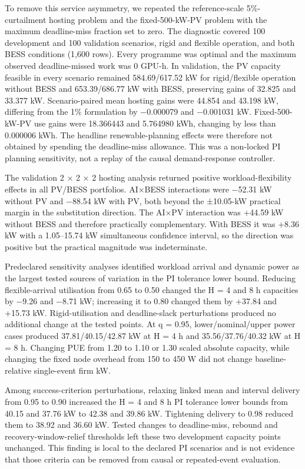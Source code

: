 \documentclass[10pt,a4paper]{article}
\begin{document}
To remove this service asymmetry, we repeated the reference-scale 5\%-curtailment hosting problem and the fixed-500-kW-PV problem with the maximum deadline-miss fraction set to zero. The diagnostic covered 100 development and 100 validation scenarios, rigid and flexible operation, and both BESS conditions (1,600 rows). Every programme was optimal and the maximum observed deadline-missed work was 0 GPU-h. In validation, the PV capacity feasible in every scenario remained 584.69/617.52 kW for rigid/flexible operation without BESS and 653.39/686.77 kW with BESS, preserving gains of 32.825 and 33.377 kW. Scenario-paired mean hosting gains were 44.854 and 43.198 kW, differing from the 1\% formulation by −0.000079 and −0.001031 kW. Fixed-500-kW-PV use gains were 18.366443 and 5.764980 kWh, changing by less than 0.000006 kWh. The headline renewable-planning effects were therefore not obtained by spending the deadline-miss allowance. This was a non-locked PI planning sensitivity, not a replay of the causal demand-response controller.


The validation 2 × 2 × 2 hosting analysis returned positive workload-flexibility effects in all PV/BESS portfolios. AI×BESS interactions were −52.31 kW without PV and −88.54 kW with PV, both beyond the ±10.05-kW practical margin in the substitution direction. The AI×PV interaction was +44.59 kW without BESS and therefore practically complementary. With BESS it was +8.36 kW with a 1.05–15.74 kW simultaneous confidence interval, so the direction was positive but the practical magnitude was indeterminate.


Predeclared sensitivity analyses identified workload arrival and dynamic power as the largest tested sources of variation in the PI tolerance lower bound. Reducing flexible-arrival utilisation from 0.65 to 0.50 changed the H = 4 and 8 h capacities by −9.26 and −8.71 kW; increasing it to 0.80 changed them by +37.84 and +15.73 kW. Rigid-utilisation and deadline-slack perturbations produced no additional change at the tested points. At q = 0.95, lower/nominal/upper power cases produced 37.81/40.15/42.87 kW at H = 4 h and 35.56/37.76/40.32 kW at H = 8 h. Changing PUE from 1.20 to 1.10 or 1.30 scaled absolute capacity, while changing the fixed node overhead from 150 to 450 W did not change baseline-relative single-event firm kW.


Among success-criterion perturbations, relaxing linked mean and interval delivery from 0.95 to 0.90 increased the H = 4 and 8 h PI tolerance lower bounds from 40.15 and 37.76 kW to 42.38 and 39.86 kW. Tightening delivery to 0.98 reduced them to 38.92 and 36.60 kW. Tested changes to deadline-miss, rebound and recovery-window-relief thresholds left these two development capacity points unchanged. This finding is local to the declared PI scenarios and is not evidence that those criteria can be removed from causal or repeated-event evaluation.
\end{document}
